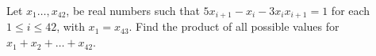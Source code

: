 Let $x_1 \dots, x_{42}$, be real numbers such that $5x_{i+1}-x_i-3x_ix_{i+1}=1$ for each $1 \le i \le 42$, with $x_1=x_{43}$. Find the product of all possible values for $x_1 + x_2 + \dots + x_{42}$.
